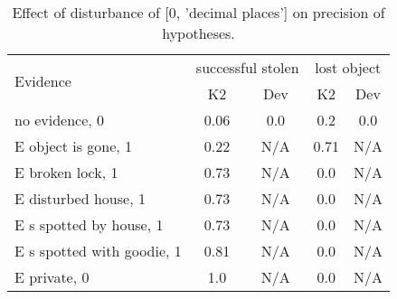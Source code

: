 \begin{table}\begin{tabular}{l|cc|cc}\toprule\multirow{2}{*}{Evidence} & \multicolumn{2}{c}{successful stolen}& \multicolumn{2}{c}{lost object}\\& {K2} & {Dev}& {K2} & {Dev}\\\midrule
no evidence, 0 & \cellcolor{Bittersweet}0.06&\cellcolor{Bittersweet}0.0&\cellcolor{Bittersweet}0.2&\cellcolor{Bittersweet}0.0\\E object is gone, 1 & \cellcolor{Bittersweet}0.22&\cellcolor{Bittersweet}N/A&\cellcolor{Bittersweet}0.71&\cellcolor{Bittersweet}N/A\\E broken lock, 1 & \cellcolor{Bittersweet}0.73&\cellcolor{Bittersweet}N/A&\cellcolor{Bittersweet}0.0&\cellcolor{Bittersweet}N/A\\E disturbed house, 1 & \cellcolor{Bittersweet}0.73&\cellcolor{Bittersweet}N/A&\cellcolor{Bittersweet}0.0&\cellcolor{Bittersweet}N/A\\E s spotted by house, 1 & \cellcolor{Bittersweet}0.73&\cellcolor{Bittersweet}N/A&\cellcolor{Bittersweet}0.0&\cellcolor{Bittersweet}N/A\\E s spotted with goodie, 1 & \cellcolor{Bittersweet}0.81&\cellcolor{Bittersweet}N/A&\cellcolor{Bittersweet}0.0&\cellcolor{Bittersweet}N/A\\E private, 0 & \cellcolor{Bittersweet}1.0&\cellcolor{Bittersweet}N/A&\cellcolor{Bittersweet}0.0&\cellcolor{Bittersweet}N/A\\\bottomrule\end{tabular}\caption{Effect of disturbance of [0, 'decimal places'] on precision of hypotheses.}\end{table}